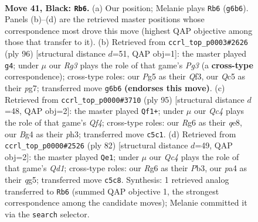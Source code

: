 \documentclass[11pt]{article}
\begin{document}
\clearpage

\begin{figure}[p]\centering
\begin{subfigure}{0.46\textwidth}\centering
\resizebox{\linewidth}{!}{%
\newchessgame
\chessboard[
  setfen={5k2/p4p2/6rp/2q1p1p1/P5b1/8/K7/8 b - - 3 41},
  showmover=false,
  pgfstyle=straightmove, color=movearrow, markmove={g6-b6}
]}
\caption{}
\end{subfigure}\hfill
\begin{subfigure}{0.46\textwidth}\centering
\resizebox{\linewidth}{!}{%
\newchessgame
\chessboard[
  setfen={4q2k/6p1/7p/7P/8/5QP1/5P1K/8 w - - 11 49},
  showmover=false,
  pgfstyle=straightmove, color=movearrow, markmove={g3-g4}
]}
\caption{}
\end{subfigure}
\\[4pt]
\begin{subfigure}{0.46\textwidth}\centering
\resizebox{\linewidth}{!}{%
\newchessgame
\chessboard[
  setfen={4Q3/6pk/7p/5qp1/8/7P/6P1/7K b - - 1 48},
  showmover=false,
  pgfstyle=straightmove, color=movearrow, markmove={f5-f1}
]}
\caption{}
\end{subfigure}\hfill
\begin{subfigure}{0.46\textwidth}\centering
\resizebox{\linewidth}{!}{%
\newchessgame
\chessboard[
  setfen={2b5/7p/p1k5/6q1/1p6/1P6/P1P5/BK1Q4 w - - 0 42},
  showmover=false,
  pgfstyle=straightmove, color=movearrow, markmove={d1-e1}
]}
\caption{}
\end{subfigure}
\caption{\textbf{Move 41, Black: \texttt{Rb6}.} (a) Our position; Melanie plays \texttt{Rb6} (\texttt{g6b6}). Panels (b)--(d) are the retrieved master positions whose correspondence most drove this move (highest QAP objective among those that transfer to it). (b) Retrieved from \texttt{ccrl\_top\_p0003\#2626} (ply 96) [structural distance $d$=51, QAP obj=1]: the master played \texttt{g4}; under $\mu$ our \emph{Rg3} plays the role of that game's \emph{Pg3} (a \textbf{cross-type} correspondence); cross-type roles: our \emph{P}g5 as their \emph{Q}f3, our \emph{Q}c5 as their \emph{p}g7; transferred move \texttt{g6b6} \textbf{(endorses this move)}. (c) Retrieved from \texttt{ccrl\_top\_p0000\#3710} (ply 95) [structural distance $d$=48, QAP obj=2]: the master played \texttt{Qf1+}; under $\mu$ our \emph{Qc4} plays the role of that game's \emph{Qf4}; cross-type roles: our \emph{R}g6 as their \emph{q}e8, our \emph{B}g4 as their \emph{p}h3; transferred move \texttt{c5c1}. (d) Retrieved from \texttt{ccrl\_top\_p0000\#2526} (ply 82) [structural distance $d$=49, QAP obj=2]: the master played \texttt{Qe1}; under $\mu$ our \emph{Qc4} plays the role of that game's \emph{Qd1}; cross-type roles: our \emph{R}g6 as their \emph{P}b3, our \emph{p}a4 as their \emph{q}g5; transferred move \texttt{c5c8}. Synthesis: 1 retrieved analog transferred to \texttt{Rb6} (summed QAP objective 1, the strongest correspondence among the candidate moves); Melanie committed it via the \texttt{search} selector.}
\label{fig:thought-m81}
\end{figure}
\end{document}
